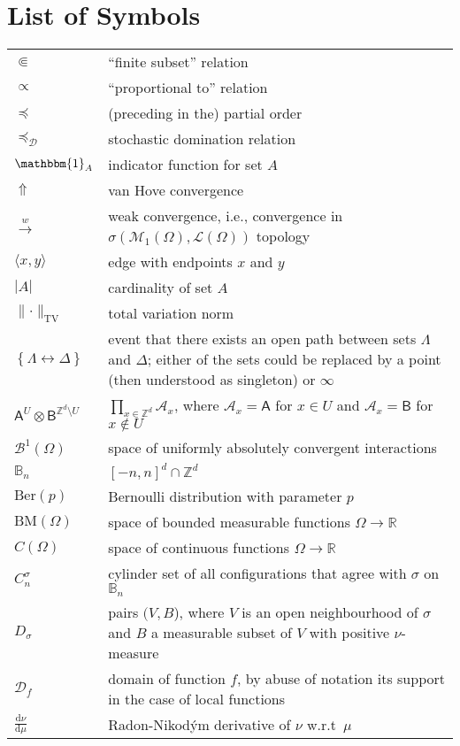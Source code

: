 \documentclass[12pt]{article}
\newcommand{\A}{\mathcal{A}}
\renewcommand{\AA}{\mathsf{A}}
\newcommand{\BB}{\mathscr{B}}
\newcommand{\BBB}{\mathbb{B}}
\newcommand{\AB}{\mathsf{B}}
\newcommand{\D}{\mathcal{D}}
\renewcommand{\d}{\mathrm{d}}
\newcommand{\Loc}{\mathcal{L}}
\newcommand{\M}{\mathcal{M}}
\newcommand{\R}{\mathbb{R}}
\newcommand{\Z}{\mathbb{Z}}
\newcommand{\BM}{\mathrm{BM}}
\newcommand{\TV}{\mathrm{TV}}
\newcommand{\set}[1]{\left\{#1\right\}}
\newcommand{\ra}{\rightarrow}
\newcommand{\pika}{\boldsymbol{\cdot}}
\newcommand{\1}{\mathbbm{1}}
\renewcommand{\sp}[1]{\langle #1\rangle}
\newcommand{\5}{\vspace{0.5cm}}
\theoremstyle{definition}
\begin{document}
\section*{List of Symbols}

\begin{tabular}{p{4cm}p{10cm}}
$\Subset$ & ``finite subset'' relation \\
$\propto$ & ``proportional to'' relation \\
$\preceq$ & (preceding in the) partial order \\
$\preceq_\D$ & stochastic domination relation \\
$\1_A$ & indicator function for set $A$ \\
$\Uparrow$ & van Hove convergence \\
$\xrightarrow{w}$ & weak convergence, i.e., convergence in $\sigma(\M_1(\Omega),\Loc(\Omega))$ topology \\
$\sp{x,y}$ & edge with endpoints $x$ and $y$ \\
$|A|$ & cardinality of set $A$ \\
$\|\!\pika\!\|_\TV$ & total variation norm \\
$\set{\Lambda\leftrightarrow\Delta}$ & event that there exists an open path between sets $\Lambda$ and $\Delta$; either of the sets could be replaced by a point (then understood as singleton) or $\infty$ \\
$\AA^U\otimes\AB^{\Z^d\setminus U}$ & $\prod_{x\in\Z^d}\A_x$, where $\A_x=\AA$ for $x\in U$ and $\A_x=\AB$ for $x\notin U$ \\
$\BB^1(\Omega)$ & space of uniformly absolutely convergent interactions \\
$\BBB_n$ & $[-n,n]^d\cap\Z^d$ \\
$\mathrm{Ber}(p)$ & Bernoulli distribution with parameter $p$ \\
$\BM(\Omega)$ & space of bounded measurable functions $\Omega\ra\R$ \\
$C(\Omega)$ & space of continuous functions $\Omega\ra\R$ \\
$C_n^\sigma$ & cylinder set of all configurations that agree with $\sigma$ on $\BBB_n$ \\
$D_\sigma$ & pairs $(V,B$), where $V$ is an open neighbourhood of $\sigma$ and $B$ a measurable subset of $V$ with positive $\nu$-measure \\
$\D_f$ & domain of function $f$, by abuse of notation its support in the case of local functions \\
$\frac{\d\nu}{\d\mu}$ & Radon-Nikod\'ym derivative of $\nu$ w.r.t~$\mu$ \\

\end{tabular}
\end{document}
